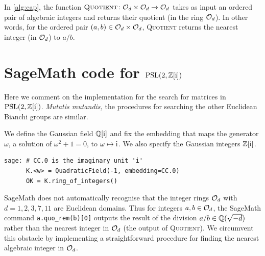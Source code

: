 \documentclass[runningheads]{llncs}
\begin{document}
In \cref{alg:cap}, the function \(\textsc{Quotient}\colon \mathcal{O}_d \times \mathcal{O}_d \to \mathcal{O}_d\) takes as input an ordered pair of algebraic integers and returns their quotient (in the ring \(\mathcal{O}_d\)).
In other words, for the ordered pair \((a,b)\in\mathcal{O}_d\times \mathcal{O}_d\), \textsc{Quotient} returns the nearest integer (in \(\mathcal{O}_d\)) to \(a/b\).

\section{SageMath code for \texorpdfstring{\(\operatorname{PSL}(2,\mathbb{Z}[\mathrm{i}])\)}{PSL(2,Z[i])}}
Here we comment on the implementation for the search for matrices in \(\operatorname{PSL}(2,\mathbb{Z}[\mathrm{i}])\). \textit{Mutatis mutandis,} the procedures for searching the other Euclidean Bianchi groups are similar.


\medskip
We define the Gaussian field \(\mathbb{Q}[\mathrm{i}]\) and fix the embedding that maps the generator \(\omega\), a solution of \(\omega^2+1=0\), to \(\omega \mapsto \mathrm{i}\).  We also specify the Gaussian integers \(\mathbb{Z}[\mathrm{i}]\).
%
\begin{lstlisting}
sage: # CC.0 is the imaginary unit 'i'
      K.<w> = QuadraticField(-1, embedding=CC.0)
      OK = K.ring_of_integers()
\end{lstlisting}

SageMath does not automatically recognise that the integer rings \(\mathcal{O}_d\) with \(d=1,2,3,7,11\) are Euclidean domains.
Thus for integers \(a,b\in\mathcal{O}_d\), the SageMath command \verb|a.quo_rem(b)[0]| outputs the result of the division \(a/b\in\mathbb{Q}(\sqrt{-d})\) rather than the nearest integer in \(\mathcal{O}_d\) (the output of \textsc{Quotient}).
We circumvent this obstacle by implementing a straightforward procedure for finding the nearest algebraic integer in \(\mathcal{O}_d\).
\end{document}
